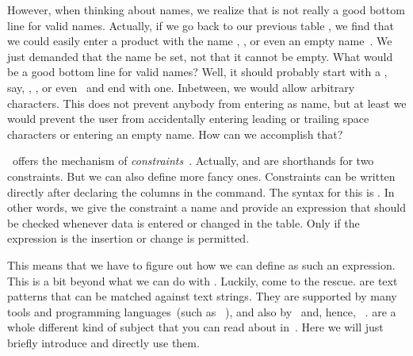 However, when thinking about names, we realize that  is not really a good bottom line for valid names.
Actually, if we go back to our previous table , we find that we could easily enter a product with the name , , or even an empty name~.
We just demanded that the name be set, not that it cannot be empty.
What would be a good bottom line for valid names?
Well, it should probably start with a , say, , , or even~ and end with one.
Inbetween, we would allow arbitrary characters.
This does not prevent anybody from entering  as name, but at least we would prevent the user from accidentally entering leading or trailing space characters or entering an empty name.
How can we accomplish that?%
%
\begin{sloppypar}%
\sql\ offers the mechanism of \emph{constraints}~\cite{PGDG:PD:C}.
Actually,  and  are shorthands for two constraints.
But we can also define more fancy ones.
Constraints can be written directly after declaring the columns in the  command.
The syntax for this is .
In other words, we give the constraint a name and provide an expression that should be checked whenever data is entered or changed in the table.
Only if the expression is  the insertion or change is permitted.%
\end{sloppypar}%
%
This means that we have to figure out how we can define  as such an expression.
This is a bit beyond what we can do with .
Luckily,  come to the rescue.
 are text patterns that can be matched against text strings.
They are supported by many tools and programming languages~(such as \python~\cite{programmingWithPython}), and also by \sql\ and, hence, \postgresql~\cite{PGDG:PD:PRE}.
 are a whole different kind of subject that you can read about in~\cite{PGDG:PD:PRE}.
Here we will just briefly introduce and directly use them.

